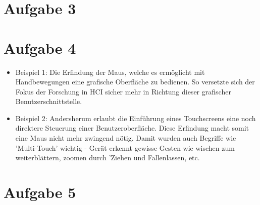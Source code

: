 \documentclass{article}
\begin{document}
    \section{Aufgabe 3}


    \section{Aufgabe 4}
    \begin{itemize}
        \item Beispiel 1: Die Erfindung der Maus, welche es ermöglicht mit Handbewegungen
        eine grafische Oberfläche zu bedienen. So versetzte sich der Fokus der Forschung in HCI
        sicher mehr in Richtung dieser grafischer Benutzerschnittstelle.

        \item Beispiel 2: Andersherum erlaubt die Einführung eines Touchscreens eine
        noch direktere Steuerung einer Benutzeroberfläche. Diese Erfindung macht somit eine 
        Maus nicht mehr zwingend nötig. Damit wurden auch Begriffe wie 'Multi-Touch' wichtig -
        Gerät erkennt gewisse Gesten wie wischen zum weiterblättern, zoomen durch 'Ziehen und Fallenlassen, etc. 
        
    \end{itemize}

    \section{Aufgabe 5}
\end{document}
